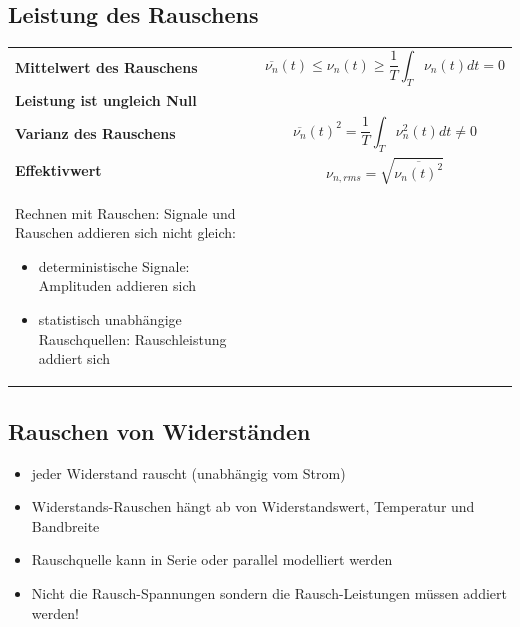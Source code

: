 \subsection{Leistung des Rauschens}
\begin{tabular}{ll}
\textbf{Mittelwert des Rauschens}&
\begin{minipage}{9cm}
\begin{equation}
\overline{\nu_{n}}(t)\leq \nu_{n}(t)\geq \frac{1}{T}\int_{T}\nu_{n}(t)dt=0
\end{equation}
\end{minipage}
\\
\textbf{Leistung ist ungleich Null}&\\
\textbf{Varianz des Rauschens}&
\begin{minipage}{9cm}
\begin{equation}
\overline{\nu_{n}}(t)^2=\frac{1}{T}\int_{T}\nu^2_{n}(t)dt\neq0
\end{equation}
\end{minipage}
\\
\textbf{Effektivwert}&
\begin{minipage}{9cm}
\begin{equation}
\nu_{n,rms}=\sqrt{\overline{\nu_{n}(t)^2}}
\end{equation}
\end{minipage}
\\
\begin{minipage}{9cm}
Rechnen mit Rauschen: Signale und Rauschen addieren sich nicht gleich:
\begin{itemize}
  \item deterministische Signale: Amplituden addieren sich
  \item statistisch unabhängige Rauschquellen: Rauschleistung addiert sich
\end{itemize}
\end{minipage}
&
\\
\end{tabular}

\subsection{Rauschen von Widerständen}
\begin{itemize}
  \item jeder Widerstand rauscht (unabhängig vom Strom)
  \item Widerstands-Rauschen hängt ab von Widerstandswert, Temperatur und
  Bandbreite
  \item Rauschquelle kann in Serie oder parallel modelliert werden
  \item Nicht die Rausch-Spannungen sondern die Rausch-Leistungen müssen addiert
  werden!
\end{itemize}
